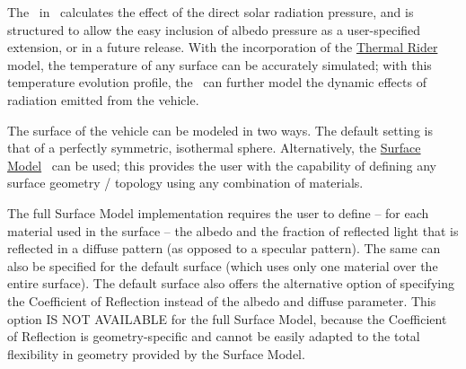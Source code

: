 The \RadiationPressureDesc\ in \JEODid\ calculates the effect of the direct
solar radiation pressure, and is structured to allow the easy inclusion of albedo
pressure as a user-specified extension, or in a future release.
With the incorporation of the
\href{file:\JEODHOME/models/interactions/thermal_rider/docs/thermal_rider.pdf}{Thermal
Rider}~\cite{dynenv:THERMALRIDER} model,
the temperature of any surface can be accurately simulated; with this temperature
evolution profile, the \RadiationPressureDesc\ can further model the dynamic effects of
radiation emitted from the vehicle.

The surface of the vehicle can be modeled in two ways.  The default setting is that of a
perfectly symmetric, isothermal sphere.  Alternatively, the
\href{file:\JEODHOME/models/utils/surface_model/docs/surface_model.pdf}{Surface
Model}~\cite{dynenv:SURFACEMODEL}
can be used; this provides the user with the capability of defining any surface
geometry / topology using any combination of materials.

The full Surface Model implementation requires the user to define -- for each material
used in the surface -- the albedo and the fraction of reflected light that is reflected in a
diffuse pattern (as opposed to a specular pattern).  The same can also be specified for the default
surface (which uses only one material over the entire surface).  The default surface also offers the alternative option of specifying the Coefficient of Reflection instead of the albedo and diffuse parameter.  This option IS NOT AVAILABLE for the full Surface Model, because the Coefficient of Reflection is geometry-specific and cannot be easily adapted to the total flexibility in geometry provided by the Surface Model.
